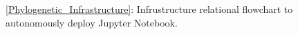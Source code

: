 \ref{Phylogenetic_Infrastructure}: Infrustructure relational flowchart to autonomously deploy Jupyter Notebook. 

